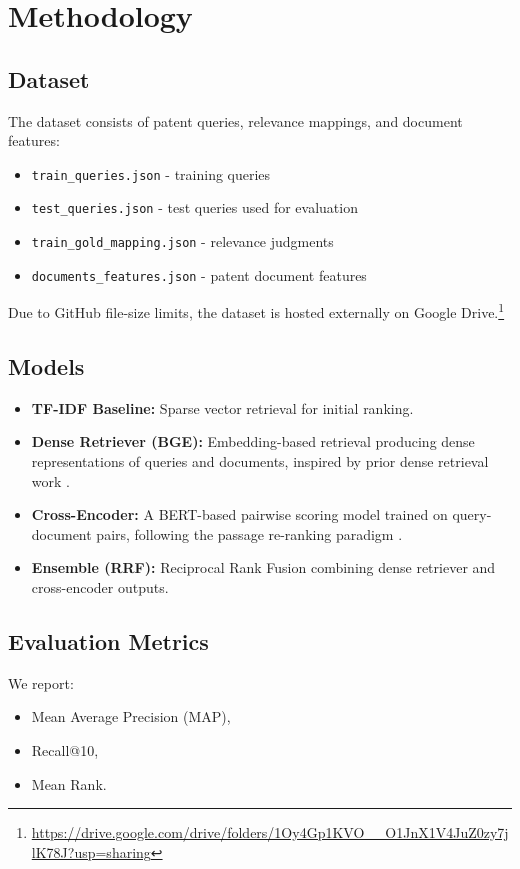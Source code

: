 \documentclass[11pt,a4paper]{article}
\begin{document}
\section{Methodology}
\subsection{Dataset}
The dataset consists of patent queries, relevance mappings, and document features:
\begin{itemize}
    \item \texttt{train\_queries.json} - training queries
    \item \texttt{test\_queries.json} - test queries used for evaluation
    \item \texttt{train\_gold\_mapping.json} - relevance judgments
    \item \texttt{documents\_features.json} - patent document features
\end{itemize}
Due to GitHub file-size limits, the dataset is hosted externally on Google Drive.\footnote{\url{https://drive.google.com/drive/folders/1Oy4Gp1KVO__O1JnX1V4JuZ0zy7jlK78J?usp=sharing}}

\subsection{Models}
\begin{itemize}
    \item \textbf{TF-IDF Baseline:} Sparse vector retrieval for initial ranking.
    \item \textbf{Dense Retriever (BGE):} Embedding-based retrieval producing dense representations of queries and documents, inspired by prior dense retrieval work \cite{karpukhin-etal-2020-dense}.
    \item \textbf{Cross-Encoder:} A BERT-based pairwise scoring model trained on query-document pairs, following the passage re-ranking paradigm \cite{nogueira2019passage}.
    \item \textbf{Ensemble (RRF):} Reciprocal Rank Fusion combining dense retriever and cross-encoder outputs.
\end{itemize}

\subsection{Evaluation Metrics}
We report:
\begin{itemize}
    \item Mean Average Precision (MAP),
    \item Recall@10,
    \item Mean Rank.
\end{itemize}
\end{document}
